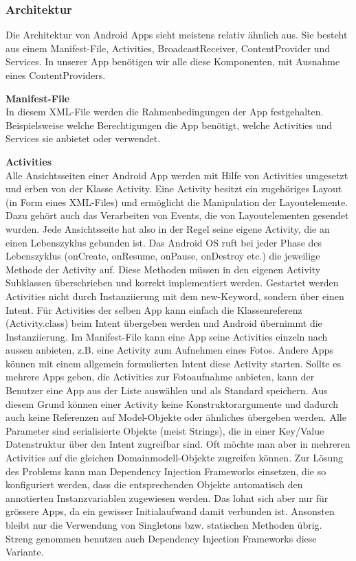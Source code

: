 \subsubsection{Architektur}
\label{sec:androidArchSolution}
Die Architektur von Android Apps sieht meistens relativ ähnlich aus. Sie besteht aus einem Manifest-File, Activities, BroadcastReceiver, ContentProvider und Services. In unserer App benötigen wir alle diese Komponenten, mit Ausnahme eines ContentProviders.

\textbf{Manifest-File}\\
In diesem XML-File werden die Rahmenbedingungen der App festgehalten. Beispielsweise welche Berechtigungen die App benötigt, welche Activities und Services sie anbietet oder verwendet.

\textbf{Activities}\\
Alle Ansichtsseiten einer Android App werden mit Hilfe von Activities umgesetzt und erben von der Klasse Activity. Eine Activity besitzt ein zugehöriges Layout (in Form eines XML-Files) und ermöglicht die Manipulation der Layoutelemente. Dazu gehört auch das Verarbeiten von Events, die von Layoutelementen gesendet wurden. Jede Ansichtsseite hat also in der Regel seine eigene Activity, die an einen Lebenszyklus gebunden ist. Das Android OS ruft bei jeder Phase des Lebenszyklus (onCreate, onResume, onPause, onDestroy etc.) die jeweilige Methode der Activity auf. Diese Methoden müssen in den eigenen Activity Subklassen überschrieben und korrekt implementiert werden. Gestartet werden Activities nicht durch Instanziierung mit dem new-Keyword, sondern über einen Intent. Für Activities der selben App kann einfach die Klassenreferenz (Activity.class) beim Intent übergeben werden und Android übernimmt die Instanziierung. Im Manifest-File kann eine App seine Activities einzeln nach aussen anbieten, z.B. eine Activity zum Aufnehmen eines Fotos. Andere Apps können mit einem allgemein formulierten Intent diese Activity starten. Sollte es mehrere Apps geben, die Activities zur Fotoaufnahme anbieten, kann der Benutzer eine App aus der Liste auswählen und als Standard speichern. Aus diesem Grund können einer Activity keine Konstruktorargumente und dadurch auch keine Referenzen auf Model-Objekte oder ähnliches übergeben werden. Alle Parameter sind serialisierte Objekte (meist Strings), die in einer Key/Value Datenstruktur über den Intent zugreifbar sind. Oft möchte man aber in mehreren Activities auf die gleichen Domainmodell-Objekte zugreifen können. Zur Lösung des Problems kann man Dependency Injection Frameworks einsetzen, die so konfiguriert werden, dass die entsprechenden Objekte automatisch den annotierten Instanzvariablen zugewiesen werden. Das lohnt sich aber nur für grössere Apps, da ein gewisser Initialaufwand damit verbunden ist. Ansonsten bleibt nur die Verwendung von Singletons bzw. statischen Methoden übrig. Streng genommen benutzen auch Dependency Injection Frameworks diese Variante.

